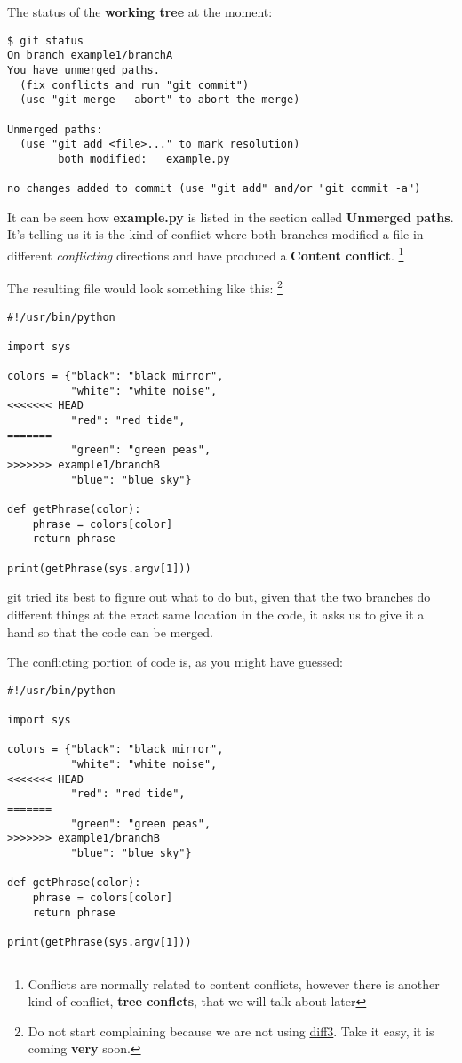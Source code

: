 The status of the {\bf working tree} at the moment:
\begin{lstlisting}[style=console_style, caption={\bf Example 1} - git status]
$ git status
On branch example1/branchA
You have unmerged paths.
  (fix conflicts and run "git commit")
  (use "git merge --abort" to abort the merge)

Unmerged paths:
  (use "git add <file>..." to mark resolution)
        both modified:   example.py

no changes added to commit (use "git add" and/or "git commit -a")
\end{lstlisting}

It can be seen how {\bf example.py} is listed in the section called {\bf Unmerged paths}. It's telling us it is the kind of conflict
where both branches modified a file in different {\it conflicting} directions and have produced a {\bf Content conflict}.
\footnote{Conflicts are normally related to content conflicts, however there is another kind of conflict, {\bf tree conflcts}, that
we will talk about later}

The resulting file would look something like this:
\footnote{Do not start complaining because we are not using \hyperref[diff3]{diff3}. Take it easy, it is coming {\bf very} soon.}
\begin{lstlisting}[style=python_style, caption={\bf example 1} - conflicting file]
#!/usr/bin/python

import sys

colors = {"black": "black mirror",
          "white": "white noise",
<<<<<<< HEAD
          "red": "red tide",
=======
          "green": "green peas",
>>>>>>> example1/branchB
          "blue": "blue sky"}

def getPhrase(color):
    phrase = colors[color]
    return phrase

print(getPhrase(sys.argv[1]))
\end{lstlisting}

git tried its best to figure out what to do but, given that the two branches do different things at the exact same location
in the code, it asks us to give it a hand so that the code can be merged.

The conflicting portion of code is, as you might have guessed:
\begin{lstlisting}[style=python_style, firstline=7, firstnumber=7, lastline=11, caption={\bf example 1} - conflict section]
#!/usr/bin/python

import sys

colors = {"black": "black mirror",
          "white": "white noise",
<<<<<<< HEAD
          "red": "red tide",
=======
          "green": "green peas",
>>>>>>> example1/branchB
          "blue": "blue sky"}

def getPhrase(color):
    phrase = colors[color]
    return phrase

print(getPhrase(sys.argv[1]))
\end{lstlisting}

